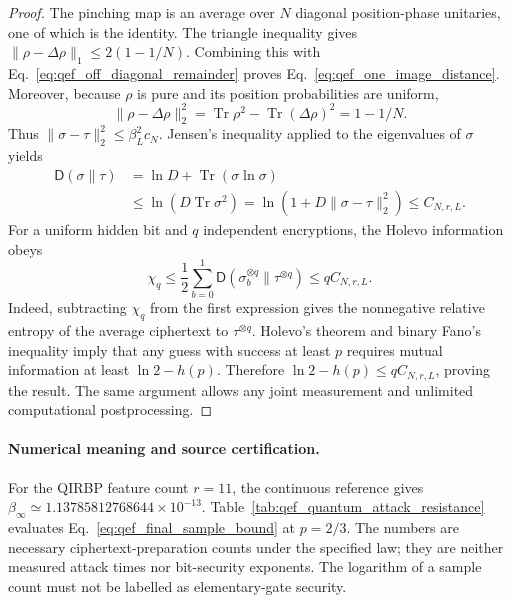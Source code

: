 {\begin{proof}
The pinching map is an average over $N$ diagonal position-phase
unitaries, one of which is the identity. The triangle inequality gives
$\|\rho-\Delta\rho\|_1\leq2(1-1/N)$. Combining this with
Eq.~\eqref{eq:qef_off_diagonal_remainder} proves
Eq.~\eqref{eq:qef_one_image_distance}.
Moreover, because $\rho$ is pure and its position probabilities are
uniform,
\begin{equation}
 \|\rho-\Delta\rho\|_2^2
 =\operatorname{Tr}\rho^2-\operatorname{Tr}(\Delta\rho)^2
 =1-1/N.
\end{equation}
Thus $\|\sigma-\tau\|_2^2\leq\beta_L^2c_N$. Jensen's inequality applied to
the eigenvalues of $\sigma$ yields
\begin{align}
 \mathsf D(\sigma\|\tau)
 &=\ln D+\operatorname{Tr}(\sigma\ln\sigma)\\
 &\leq\ln(D\operatorname{Tr}\sigma^2)
 =\ln(1+D\|\sigma-\tau\|_2^2)
 \leq C_{N,r,L}.
\end{align}
For a uniform hidden bit and $q$ independent encryptions, the Holevo
information obeys
\begin{equation}
 \chi_q\leq\frac12\sum_{b=0}^1
 \mathsf D(\sigma_b^{\otimes q}\|\tau^{\otimes q})
 \leq qC_{N,r,L}.
\end{equation}
Indeed, subtracting $\chi_q$ from the first expression gives the
nonnegative relative entropy of the average ciphertext to
$\tau^{\otimes q}$. Holevo's theorem and binary Fano's inequality
\cite{Watrous2018QEF} imply that any guess with success at least $p$
requires mutual information at least $\ln2-h(p)$. Therefore
$\ln2-h(p)\leq qC_{N,r,L}$, proving the result. The same argument
allows any joint measurement and unlimited computational postprocessing.
\end{proof}

\paragraph{Numerical meaning and source certification.}
For the QIRBP feature count $r=11$, the continuous reference gives
$\beta_\infty\simeq1.13785812768644\times10^{-13}$.
Table~\ref{tab:qef_quantum_attack_resistance} evaluates
Eq.~\eqref{eq:qef_final_sample_bound} at $p=2/3$.
The numbers are necessary ciphertext-preparation counts under the
specified law; they are neither measured attack times nor bit-security
exponents. The logarithm of a sample count must not be labelled as
elementary-gate security.

}
